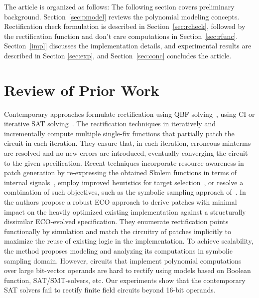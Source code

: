 
The article is organized as follows: The following section covers preliminary
background. Section~\ref{sec:pmodel} reviews the polynomial modeling
concepts. Rectification check formulation is described in
Section~\ref{sec:rcheck}, followed by the rectification function and
don't care computations in Section~\ref{sec:rfunc}. Section~\ref{impl}
discusses the implementation details, and experimental
results are described in Section \ref{sec:exp}, and
Section~\ref{sec:conc} concludes the article. 

\section{Review of Prior Work}

Contemporary approaches formulate rectification
using QBF solving~\cite{scholl:2}, using CI or iterative SAT
solving~\cite{MF_Roland:ICCAD10,MF_Huang:DATE12}.  
The rectification techniques in 
\cite{fujita:2015,SS_Fujita:ISCAS19,MF_Huang:DATE12,SS_Roland:DAC18} 
iteratively and incrementally compute multiple single-fix functions
that partially patch the circuit in each iteration.
 They ensure that, in each iteration, erroneous minterms are resolved
and no new errors are introduced, eventually converging the circuit
to the given specification.
Recent techniques incorporate resource awareness in 
patch generation by re-expressing the obtained Skolem functions 
in terms of internal signals~\cite{SS_Alan:DAC18}, employ improved heuristics for
target selection~\cite{SS_Fujita:ISCAS19}, or resolve a combination of
such objectives, such as the symbolic sampling approach of~\cite{SS_Roland:DAC19}.
 In~\cite{SS_Roland:DAC19} the authors propose a robust ECO approach to derive 
patches with minimal impact on the heavily optimized existing implementation 
against a structurally dissimilar ECO-evolved specification. 
They enumerate rectification points functionally by simulation and match the circuitry of patches implicitly to maximize the reuse of existing logic in the implementation. To achieve 
scalability, the method proposes modeling and analyzing its computations 
in symbolic sampling domain. However, circuits that implement polynomial 
computations over large bit-vector operands are hard to rectify using 
models based on Boolean function, SAT/SMT-solvers, etc.
Our experiments show that the contemporary SAT solvers fail to rectify 
finite field circuits beyond 16-bit operands.

